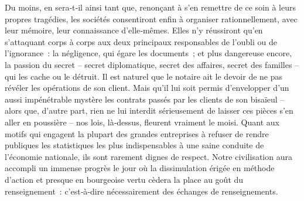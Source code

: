\documentclass[french,twoside]{book} %
\newcommand{\astermono}{\medskip\centerline{\color{rubric}\large\selectfont{\syms ✻}}\medskip\par}%
\begin{document}
Du moins, en sera‑t‑il ainsi tant que, renonçant à s’en remettre de ce soin à leurs propres tragédies, les sociétés consentiront enfin à organiser rationnellement, avec leur mémoire, leur connaissance d’elle‑mêmes. Elles n’y réussiront qu’en s’attaquant corps à corps aux deux principaux res­ponsables de l’oubli ou de l’ignorance : la négligence, qui égare les docu­ments ; et plus dangereuse encore, la passion du secret – secret diplo­matique, secret des affaires, secret des familles – qui les cache ou le détruit. Il est naturel que le notaire ait le devoir de ne pas révéler les opérations de son client. Mais qu’il lui soit permis d’envelopper d’un aussi impénétrable mystère les contrats passés par les clients de son bisaïeul – alors que, d’autre part, rien ne lui interdit sérieusement de laisser ces pièces s’en aller en poussière – nos lois, là‑dessus, fleurent vraiment le moisi. Quant aux motifs qui engagent la plupart des grandes entreprises à refuser de rendre publiques les statistiques les plus indispensables à une saine conduite de l’économie nationale, ils sont rarement dignes de respect. Notre civilisation aura accompli un immense progrès le jour où la dissimulation érigée en méthode d’action et presque en bourgeoise vertu cèdera la place au goût du renseignement : c’est‑à‑dire nécessai­rement des échanges de renseignements.\par

\astermono
\end{document}
